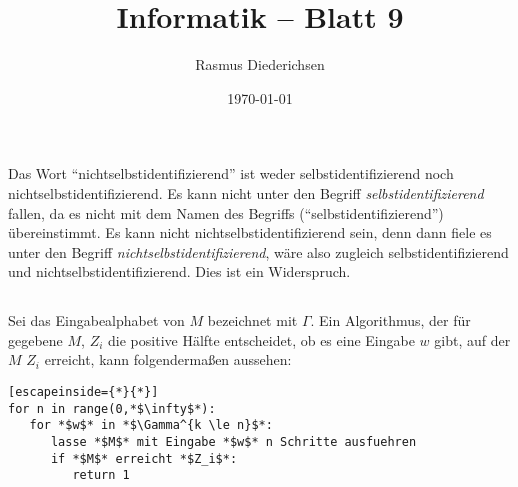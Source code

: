 \documentclass{article}
\title{Informatik \rotatebox[origin=c]{180}{D}\raisebox{2pt}{:} -- Blatt 9}
\author{Rasmus Diederichsen}
\date{\today}
\begin{document}
\maketitle

\section{} 
\subsection{} 

Das Wort ``nichtselbstidentifizierend'' ist weder selbstidentifizierend noch
nichtselbstidentifizierend. Es kann nicht unter den Begriff
\emph{selbstidentifizierend} fallen, da es nicht mit dem Namen des Begriffs
(``selbstidentifizierend'') übereinstimmt. Es kann nicht
nichtselbstidentifizierend sein, denn dann fiele es unter den Begriff
\emph{nichtselbstidentifizierend}, wäre also zugleich selbstidentifizierend und
nichtselbstidentifizierend. Dies ist ein Widerspruch.

\subsection{} 

Sei das Eingabealphabet von $M$ bezeichnet mit $\Gamma$.
Ein Algorithmus, der für gegebene $M$, $Z_i$ die positive Hälfte entscheidet, ob es eine Eingabe
$w$ gibt, auf der $M$ $Z_i$ erreicht, kann folgendermaßen aussehen:


\begin{lstlisting}[escapeinside={*}{*}]
for n in range(0,*$\infty$*):
   for *$w$* in *$\Gamma^{k \le n}$*:
      lasse *$M$* mit Eingabe *$w$* n Schritte ausfuehren
      if *$M$* erreicht *$Z_i$*:
         return 1
\end{lstlisting}

\subsection{} 

\end{document}
